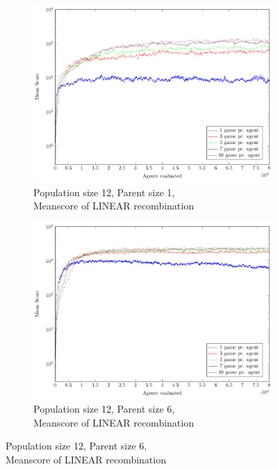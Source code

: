 \begin{figure}
\begin{subfigure}[b]{0.45\textwidth}
    \end{subfigure}
    \begin{subfigure}[b]{0.45\textwidth}
    	\centering
    	\caption{Population size 12, Parent size 1, \\ Meanscore of LINEAR recombination}
        \includegraphics[width=\textwidth]{data/cma_population_offspring/12x_split/linear_l12_o1/mean/PlotFile.pdf}
    \end{subfigure}
    \begin{subfigure}[b]{0.45\textwidth}
    	\centering
    	\caption{Population size 12, Parent size 6, \\ Meanscore of LINEAR recombination}
        \includegraphics[width=\textwidth]{data/cma_population_offspring/12x_split/linear_l12_o6/mean/PlotFile.pdf}

\end{subfigure}
\end{figure}
